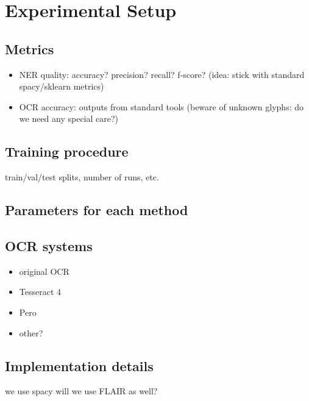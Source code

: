 \section{Experimental Setup}

\subsection{Metrics}
\begin{itemize}
    \item NER quality: accuracy? precision? recall? f-score? (idea: stick with standard spacy/sklearn metrics)
    \item OCR accuracy: outputs from standard tools (beware of unknown glyphs: do we need any special care?)
\end{itemize}

\subsection{Training procedure}
train/val/test splits, number of runs, etc.


\subsection{Parameters for each method}

\subsection{OCR systems}
\begin{itemize}
    \item original OCR
    \item Tesseract 4
    \item Pero
    \item other?
\end{itemize}

\subsection{Implementation details}
we use spacy 
will we use FLAIR as well?